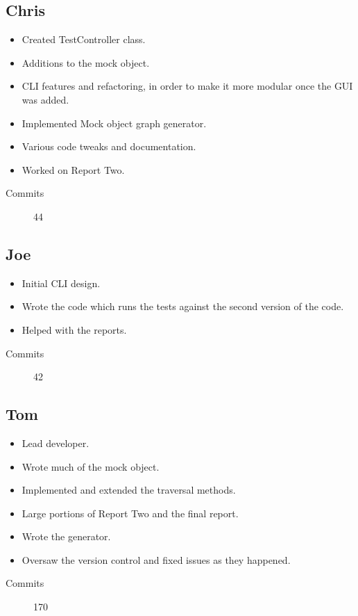   \subsection{Chris}
    \begin{itemize}
     \item Created TestController class.
     \item Additions to the mock object.
     \item CLI features and refactoring, in order to make it more modular once the GUI was added.
     \item Implemented Mock object graph generator.
     \item Various code tweaks and documentation.
     \item Worked on Report Two.
    \end{itemize}
    \begin{description}
      \item[Commits] 44
    \end{description}

  \subsection{Joe}
    \begin{itemize}
      \item Initial CLI design.
      \item Wrote the code which runs the tests against the second version of the code.
      \item Helped with the reports.
    \end{itemize}
    \begin{description}
      \item[Commits] 42
    \end{description}

  \subsection{Tom}
    \begin{itemize}
      \item Lead developer.
      \item Wrote much of the mock object.
      \item Implemented and extended the traversal methods.
      \item Large portions of Report Two and the final report.
      \item Wrote the generator.
      \item Oversaw the version control and fixed issues as they happened.
    \end{itemize}
    \begin{description}
      \item[Commits] 170
    \end{description}
